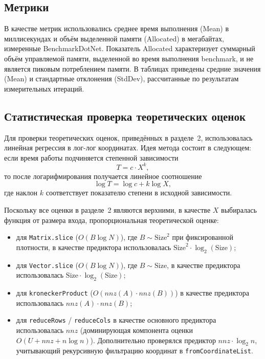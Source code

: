 \documentclass[a4paper]{article}
\begin{document}
\subsection{Метрики}

В качестве метрик использовались среднее время выполнения (Mean) в миллисекундах и объём выделенной памяти (Allocated) в мегабайтах, измеренные BenchmarkDotNet. Показатель Allocated характеризует суммарный объём управляемой памяти, выделенной во время выполнения benchmark, и не является пиковым потреблением памяти. В таблицах приведены средние значения (Mean) и стандартные отклонения (StdDev), рассчитанные по результатам измерительных итераций.

\subsection{Статистическая проверка теоретических оценок}

Для проверки теоретических оценок, приведённых в разделе~2, использовалась линейная регрессия в лог-лог координатах. Идея метода состоит в следующем: если время работы подчиняется степенной зависимости
\[
T = c \cdot X^k,
\]
то после логарифмирования получается линейное соотношение
\[
\log T = \log c + k \log X,
\]
где наклон \(k\) соответствует показателю степени в исходной зависимости.

Поскольку все оценки в разделе~2 являются верхними, в качестве \(X\) выбиралась функция от размера входа, пропорциональная теоретической оценке:
\begin{itemize}
    \item для \texttt{Matrix.slice} (\(O(B \log N)\)), где \(B \sim \text{Size}^2\) при фиксированной плотности, в качестве предиктора использовалась \(\text{Size}^2 \cdot \log_2(\text{Size})\);
    \item для \texttt{Vector.slice} (\(O(B \log N)\)), где \(B \sim \text{Size}\), в качестве предиктора использовалась \(\text{Size} \cdot \log_2(\text{Size})\);
    \item для \texttt{kroneckerProduct} (\(O(nnz(A) \cdot nnz(B))\)) в качестве предиктора использовалась \(nnz(A) \cdot nnz(B)\);
    \item для \texttt{reduceRows} / \texttt{reduceCols} в качестве основного предиктора использовалась \(nnz\) (доминирующая компонента оценки \(O(U + nnz + n \log n)\)). Дополнительно проверялся предиктор \(nnz \cdot \log_2 n\), учитывающий рекурсивную фильтрацию координат в \texttt{fromCoordinateList}.
\end{itemize}
\end{document}
